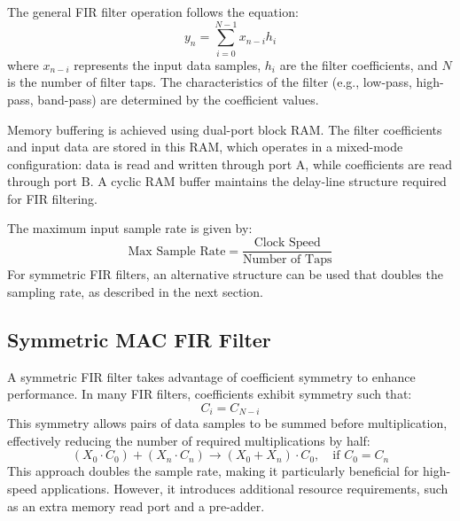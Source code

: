 \documentclass{article}
\begin{document}
	The general FIR filter operation follows the equation:
	\begin{equation}
		y_n = \sum_{i=0}^{N-1} x_{n-i} h_i
	\end{equation}
	where \( x_{n-i} \) represents the input data samples, \( h_i \) are the filter coefficients, and \( N \) is the number of filter taps. The characteristics of the filter (e.g., low-pass, high-pass, band-pass) are determined by the coefficient values.
	
	Memory buffering is achieved using dual-port block RAM. The filter coefficients and input data are stored in this RAM, which operates in a mixed-mode configuration: data is read and written through port A, while coefficients are read through port B. A cyclic RAM buffer maintains the delay-line structure required for FIR filtering.
	
	The maximum input sample rate is given by:
	\begin{equation}
		\text{Max Sample Rate} = \frac{\text{Clock Speed}}{\text{Number of Taps}}
	\end{equation}
	For symmetric FIR filters, an alternative structure can be used that doubles the sampling rate, as described in the next section.
	
	\subsection{Symmetric MAC FIR Filter}
	A symmetric FIR filter takes advantage of coefficient symmetry to enhance performance. In many FIR filters, coefficients exhibit symmetry such that:
	\begin{equation}
		C_i = C_{N-i}
	\end{equation}
	This symmetry allows pairs of data samples to be summed before multiplication, effectively reducing the number of required multiplications by half:
	\begin{equation}
		(X_0 \cdot C_0) + (X_n \cdot C_n) \rightarrow (X_0 + X_n) \cdot C_0, \quad \text{if } C_0 = C_n
	\end{equation}
	This approach doubles the sample rate, making it particularly beneficial for high-speed applications. However, it introduces additional resource requirements, such as an extra memory read port and a pre-adder.
	
\end{document}
